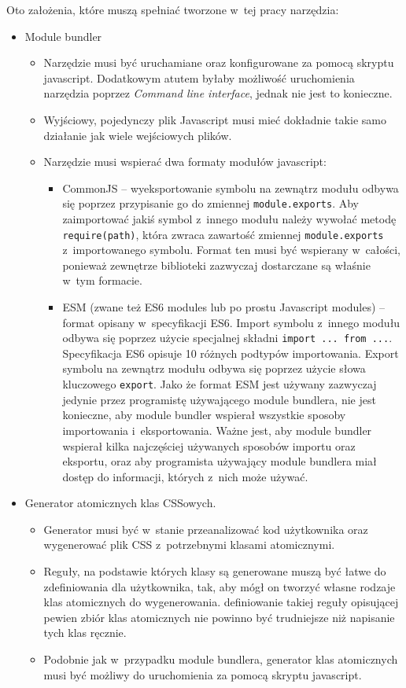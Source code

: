 \documentclass{SGGW-thesis}
\begin{document}
Oto założenia, które muszą spełniać tworzone w~tej pracy narzędzia:
\begin{itemize}
    \item Module bundler
    \begin{itemize}
        \item Narzędzie musi być uruchamiane oraz konfigurowane za pomocą skryptu javascript. Dodatkowym atutem byłaby możliwość uruchomienia narzędzia poprzez \emph{Command line interface}, jednak nie jest to konieczne.
        \item Wyjściowy, pojedynczy plik Javascript musi mieć dokładnie takie samo działanie jak wiele wejściowych plików.
        \item Narzędzie musi wspierać dwa formaty modułów javascript:
        \begin{itemize}
            \item CommonJS -- wyeksportowanie symbolu na zewnątrz modułu odbywa się poprzez przypisanie go do zmiennej \verb|module.exports|. Aby zaimportować jakiś symbol z~innego modułu należy wywołać metodę \verb|require(path)|, która zwraca zawartość zmiennej \verb|module.exports| z~importowanego symbolu. Format ten musi być wspierany w~całości, ponieważ zewnętrze biblioteki zazwyczaj dostarczane są właśnie w~tym formacie.
            \item ESM (zwane też ES6 modules lub po prostu Javascript modules) -- format opisany w~specyfikacji ES6. Import symbolu z~innego modułu odbywa się poprzez użycie specjalnej składni \verb|import ... from ...|. Specyfikacja ES6 opisuje 10 różnych podtypów importowania\cite{es6_modules_import}. Export symbolu na zewnątrz modułu odbywa się poprzez użycie słowa kluczowego \verb|export|\cite{es6_modules_export}. Jako że format ESM jest używany zazwyczaj jedynie przez programistę używającego module bundlera, nie jest konieczne, aby module bundler wspierał wszystkie sposoby importowania i~eksportowania. Ważne jest, aby module bundler wspierał kilka najczęściej używanych sposobów importu oraz eksportu, oraz aby programista używający module bundlera miał dostęp do informacji, których z~nich może używać.
        \end{itemize}
    \end{itemize}
    \item Generator atomicznych klas CSSowych.
    \begin{itemize}
        \item Generator musi być w~stanie przeanalizować kod użytkownika oraz wygenerować plik CSS z~potrzebnymi klasami atomicznymi.
        \item Reguły, na podstawie których klasy są generowane muszą być łatwe do zdefiniowania dla użytkownika, tak, aby mógł on tworzyć własne rodzaje klas atomicznych do wygenerowania. definiowanie takiej reguły opisującej pewien zbiór klas atomicznych nie powinno być trudniejsze niż napisanie tych klas ręcznie.
        \item Podobnie jak w~przypadku module bundlera, generator klas atomicznych musi być możliwy do uruchomienia za pomocą skryptu javascript.
    \end{itemize}
\end{itemize}
\end{document}
